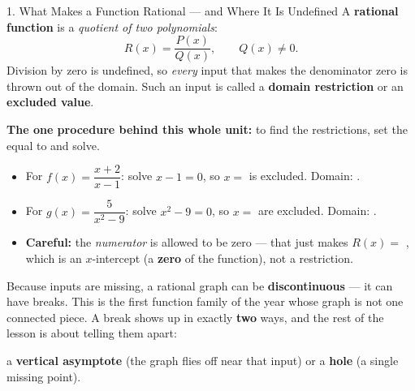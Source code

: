 \documentclass[10pt]{article}
\begin{document}
\begin{notesbox}{1. What Makes a Function Rational --- and Where It Is Undefined}
A \textbf{rational function} is a \emph{quotient of two polynomials}:
\[
  R(x) = \frac{P(x)}{Q(x)}, \qquad Q(x) \neq 0 .
\]
Division by zero is undefined, so \emph{every} input that makes the denominator zero is thrown out of
the domain. Such an input is called a \textbf{domain restriction} or an \textbf{excluded value}.

\vspace{3pt}
\textbf{The one procedure behind this whole unit:} to find the restrictions, set the
 equal to  and solve.
\begin{itemize}[leftmargin=1.5em, itemsep=3pt]
  \item For $f(x)=\dfrac{x+2}{x-1}$: solve $x-1=0$, so $x=$  is excluded.
        Domain: .
  \item For $g(x)=\dfrac{5}{x^2-9}$: solve $x^2-9=0$, so $x=$  are excluded.
        Domain: .
  \item \textbf{Careful:} the \emph{numerator} is allowed to be zero --- that just makes
        $R(x)=$ , which is an $x$-intercept (a \textbf{zero} of the function), not a
        restriction.
\end{itemize}

\vspace{3pt}
Because inputs are missing, a rational graph can be \textbf{discontinuous} --- it can have breaks.
This is the first function family of the year whose graph is not one connected piece. A break shows up
in exactly \textbf{two} ways, and the rest of the lesson is about telling them apart:
\begin{center}
\small
a \textbf{vertical asymptote} (the graph flies off near that input) \quad or \quad
a \textbf{hole} (a single missing point).
\end{center}
\end{notesbox}
\end{document}
